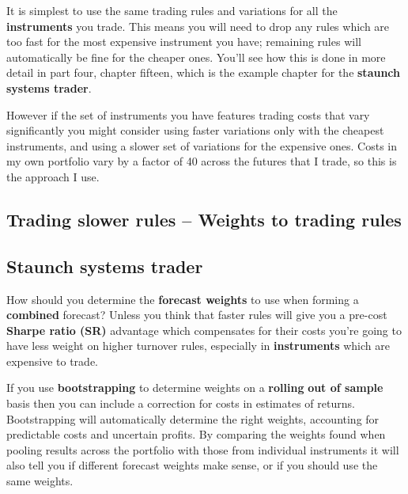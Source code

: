 It is simplest to use the same trading rules and variations for all the \textbf{instruments} you trade. This means you will need to drop any rules which are too fast for the most expensive instrument you have; remaining rules will automatically be fine for the cheaper ones. You'll see how this is done in more detail in part four, chapter fifteen, which is the example chapter for the \textbf{staunch systems trader}.

However if the set of instruments you have features trading costs that vary significantly you might consider using faster variations only with the cheapest instruments, and using a slower set of variations for the expensive ones. Costs in my own portfolio vary by a factor of 40 across the futures that I trade, so this is the approach I use.

\subsection*{Trading slower rules -- Weights to trading rules}

\subsection*{Staunch systems trader}

How should you determine the \textbf{forecast weights} to use when forming a \textbf{combined} forecast? Unless you think that faster rules will give you a pre-cost \textbf{Sharpe ratio (SR)} advantage which compensates for their costs you're going to have less weight on higher turnover rules, especially in \textbf{instruments} which are expensive to trade.

If you use \textbf{bootstrapping} to determine weights on a \textbf{rolling} \textbf{out of sample} basis then you can include a correction for costs in estimates of returns. Bootstrapping will automatically determine the right weights, accounting for predictable costs and uncertain profits. By comparing the weights found when pooling results across the portfolio with those from individual instruments it will also tell you if different forecast weights make sense, or if you should use the same weights.

